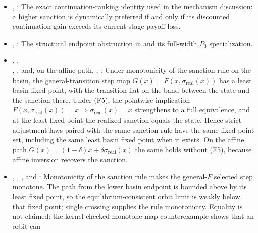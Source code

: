 \begin{itemize}[leftmargin=1.4em,itemsep=1pt]
\item {}, : The exact continuation-ranking identity used in the mechanism discussion: a higher sanction is dynamically preferred if and only if its discounted continuation gain exceeds its current stage-payoff loss.
\item {}, : The structural endpoint obstruction in  and its full-width \(P_3\) specialization.
\item {},
,\\
,
,
and, on the affine path,
,
:
Under monotonicity of the sanction rule on the basin, the general-transition
step map $G(x)=F(x,\sigma_{\mathrm{real}}(x))$ has a least basin fixed point,
with the transition flat on the band between the state and the sanction there.
Under (F5), the pointwise implication
$F(x,\sigma_{\mathrm{real}}(x))=x\Rightarrow
\sigma_{\mathrm{real}}(x)=x$ strengthens to a full equivalence, and at the
least fixed point the realized sanction equals the state.  Hence
strict-adjustment laws paired with the same sanction rule have the same
fixed-point set, including the same least basin fixed point when it exists.
On the affine path $G(x)=(1-\delta)x+\delta\sigma_{\mathrm{real}}(x)$ the same
holds without (F5), because affine inversion recovers the sanction.
\item {},
,
, and
:
Monotonicity of the sanction rule makes the general-$F$ selected step
monotone. The path from the lower basin endpoint is bounded above by its least
fixed point, so the equilibrium-consistent orbit limit is weakly below that
fixed point; single crossing supplies the rule monotonicity. Equality is not
claimed: the kernel-checked monotone-map counterexample shows that an orbit can

\end{itemize}
